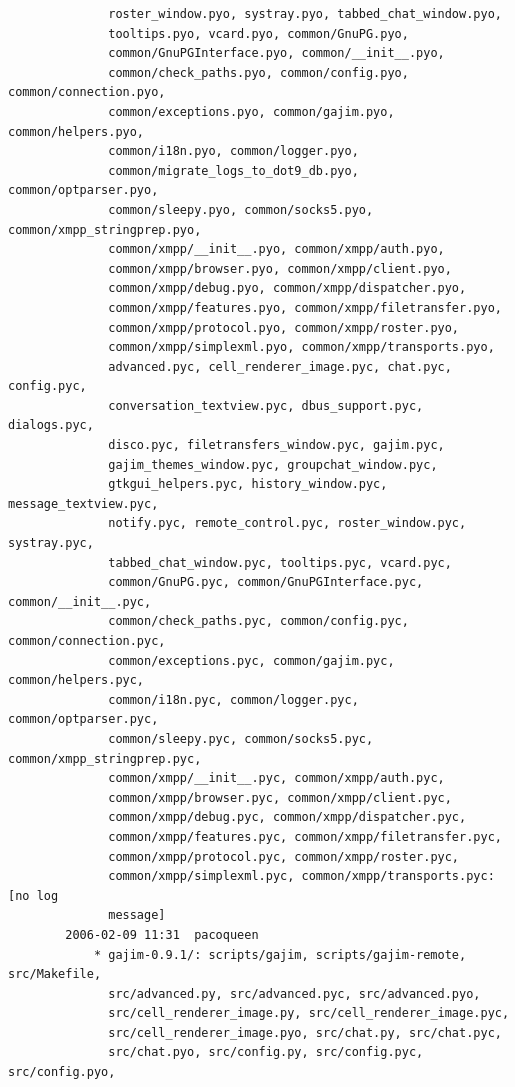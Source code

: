 \documentclass[a4paper]{article}
\begin{document}
\begin{verbatim}
              roster_window.pyo, systray.pyo, tabbed_chat_window.pyo,
              tooltips.pyo, vcard.pyo, common/GnuPG.pyo,
              common/GnuPGInterface.pyo, common/__init__.pyo,
              common/check_paths.pyo, common/config.pyo, common/connection.pyo,
              common/exceptions.pyo, common/gajim.pyo, common/helpers.pyo,
              common/i18n.pyo, common/logger.pyo,
              common/migrate_logs_to_dot9_db.pyo, common/optparser.pyo,
              common/sleepy.pyo, common/socks5.pyo, common/xmpp_stringprep.pyo,
              common/xmpp/__init__.pyo, common/xmpp/auth.pyo,
              common/xmpp/browser.pyo, common/xmpp/client.pyo,
              common/xmpp/debug.pyo, common/xmpp/dispatcher.pyo,
              common/xmpp/features.pyo, common/xmpp/filetransfer.pyo,
              common/xmpp/protocol.pyo, common/xmpp/roster.pyo,
              common/xmpp/simplexml.pyo, common/xmpp/transports.pyo,
              advanced.pyc, cell_renderer_image.pyc, chat.pyc, config.pyc,
              conversation_textview.pyc, dbus_support.pyc, dialogs.pyc,
              disco.pyc, filetransfers_window.pyc, gajim.pyc,
              gajim_themes_window.pyc, groupchat_window.pyc,
              gtkgui_helpers.pyc, history_window.pyc, message_textview.pyc,
              notify.pyc, remote_control.pyc, roster_window.pyc, systray.pyc,
              tabbed_chat_window.pyc, tooltips.pyc, vcard.pyc,
              common/GnuPG.pyc, common/GnuPGInterface.pyc, common/__init__.pyc,
              common/check_paths.pyc, common/config.pyc, common/connection.pyc,
              common/exceptions.pyc, common/gajim.pyc, common/helpers.pyc,
              common/i18n.pyc, common/logger.pyc, common/optparser.pyc,
              common/sleepy.pyc, common/socks5.pyc, common/xmpp_stringprep.pyc,
              common/xmpp/__init__.pyc, common/xmpp/auth.pyc,
              common/xmpp/browser.pyc, common/xmpp/client.pyc,
              common/xmpp/debug.pyc, common/xmpp/dispatcher.pyc,
              common/xmpp/features.pyc, common/xmpp/filetransfer.pyc,
              common/xmpp/protocol.pyc, common/xmpp/roster.pyc,
              common/xmpp/simplexml.pyc, common/xmpp/transports.pyc: [no log
              message]
        2006-02-09 11:31  pacoqueen
            * gajim-0.9.1/: scripts/gajim, scripts/gajim-remote, src/Makefile,
              src/advanced.py, src/advanced.pyc, src/advanced.pyo,
              src/cell_renderer_image.py, src/cell_renderer_image.pyc,
              src/cell_renderer_image.pyo, src/chat.py, src/chat.pyc,
              src/chat.pyo, src/config.py, src/config.pyc, src/config.pyo,

\end{verbatim}
\end{document}
